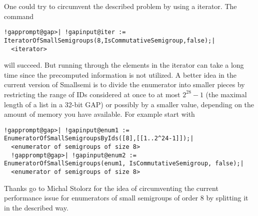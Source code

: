 \documentclass[a4paper,11pt]{report}
\begin{document}
{{{ One could try to circumvent the described problem by using a iterator. The
command 
\begin{Verbatim}[commandchars=!@|,fontsize=\small,frame=single,label=Example]
  !gapprompt@gap>| !gapinput@iter := IteratorOfSmallSemigroups(8,IsCommutativeSemigroup,false);|
  <iterator>
\end{Verbatim}
 will succeed. But running through the elements in the iterator can take a long
time since the precomputed information is not utilized. A better idea in the
current version of \textsf{Smallsemi} is to divide the enumerator into smaller pieces by restricting the range of
IDs considered at once to at most $2^{28}-1$ (the maximal length of a list in a 32-bit \textsf{GAP}) or possibly by a smaller value, depending on the amount of memory you have
available. For example start with 
\begin{Verbatim}[commandchars=!@|,fontsize=\small,frame=single,label=Example]
  !gapprompt@gap>| !gapinput@enum1 := EnumeratorOfSmallSemigroupsByIds([8],[[1..2^24-1]]);|
  <enumerator of semigroups of size 8>
  !gapprompt@gap>| !gapinput@enum2 := EnumeratorOfSmallSemigroups(enum1, IsCommutativeSemigroup, false);|
  <enumerator of semigroups of size 8>
\end{Verbatim}
 Thanks go to Michal Stolorz for the idea of circumventing the current
performance issue for enumerators of small semigroups of order 8 by splitting
it in the described way. }

 }

 
}
\end{document}
